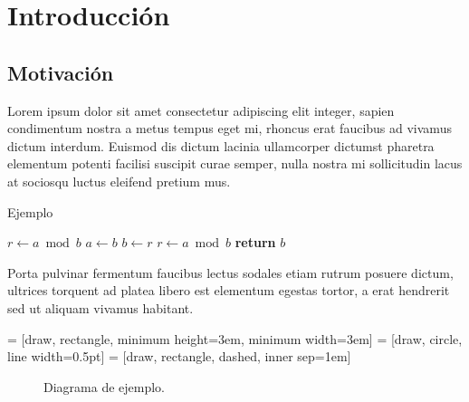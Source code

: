 \chapter{Introducción}

\section{Motivación}

\noindent Lorem ipsum dolor sit amet consectetur adipiscing elit integer, sapien condimentum nostra a metus tempus eget mi, rhoncus erat faucibus ad vivamus dictum interdum. Euismod dis dictum lacinia ullamcorper dictumst pharetra elementum potenti facilisi suscipit curae semper, nulla nostra mi sollicitudin lacus at sociosqu luctus eleifend pretium mus.

\begin{algorithm}[H]
  \caption{Ejemplo}\label{euclid}
  \begin{algorithmic}[1]
     
        \State $r\gets a \bmod b$
         
            \State $a \gets b$
            \State $b \gets r$
            \State $r \gets a \bmod b$
        \EndWhile\label{euclidendwhile}
        \State \textbf{return} $b$
    \EndProcedure
  \end{algorithmic}
\end{algorithm}

Porta \cite{Cantu-Paz98asurvey} pulvinar fermentum faucibus lectus sodales etiam rutrum posuere dictum, ultrices torquent ad platea libero est elementum egestas tortor, a erat hendrerit sed ut aliquam vivamus habitant.

 = [draw, rectangle, minimum height=3em, minimum width=3em]
 = [draw, circle, line width=0.5pt]
 = [draw, rectangle, dashed, inner sep=1em]
\begin{figure*}[h]
  \centering
  \caption{Diagrama de ejemplo.}
\end{figure*}

